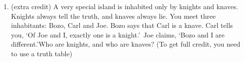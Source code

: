 \documentclass[10pt]{article} %
\begin{document}
\begin{enumerate}


\item (extra credit) A very special island is inhabited only by knights and knaves. Knights always tell the truth, and knaves always lie. You meet three inhabitants: Bozo, Carl and Joe. Bozo says that Carl is a knave. Carl tells you, \lq Of Joe and I, exactly one is a knight.\rq\ Joe claims, \lq Bozo and I are different.\rq Who are knights, and who are knaves? (To get full credit, you need to use a truth table)

\end{enumerate}
\end{document}
